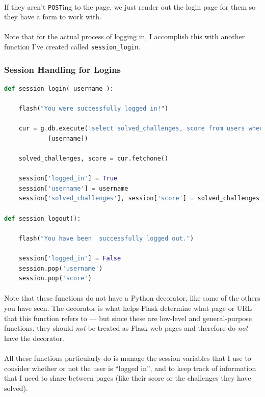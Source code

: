 \documentclass[11pt]{article}
\begin{document}
	\paragraph{} If they aren't \texttt{POST}ing to the page, we just render out the login page for them so they have a form to work with. 

	\paragraph{} Note that for the actual process of logging in, I accomplish this with another function I've created called \texttt{session\_login}.


	\newpage

	\subsubsection{Session Handling for Logins}

	\begin{lstlisting}[language=Python]
def session_login( username ):
	
	flash("You were successfully logged in!")

	cur = g.db.execute('select solved_challenges, score from users where username = (?)',
			[username])	

	solved_challenges, score = cur.fetchone()

	session['logged_in'] = True
	session['username'] = username
	session['solved_challenges'], session['score'] = solved_challenges, score

def session_logout():

	flash("You have been  successfully logged out.")

	session['logged_in'] = False
	session.pop('username')
	session.pop('score')

\end{lstlisting}

	\paragraph{} Note that these functions do not have a Python decorator, like some of the others you have seen. The decorator is what helps Flask determine what page or URL that this function refers to --- but since these are low-level and general-purpose functions, they should \textit{not} be treated as Flask web pages and therefore do \textit{not} have the decorator. 
	\paragraph{} All these functions particularly do is manage the session variables that I use to consider whether or not the user is ``logged in'', and to keep track of information that I need to share between pages (like their score or the challenges they have solved).
\end{document}
